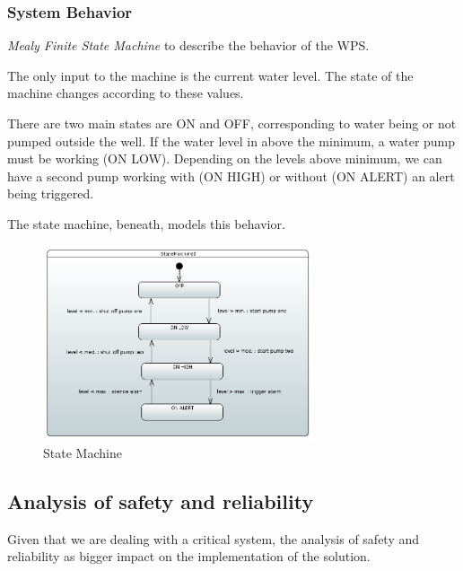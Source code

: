\documentclass[11pt]{article}
\begin{document}
\newpage

\subsubsection{System Behavior}
\textit{Mealy Finite State Machine} to describe the behavior of the WPS.

The only input to the machine is the current water level. The state of the machine changes according to these values.

There are two main states are ON and OFF, corresponding to water being or not pumped outside the well. If the water level in above the minimum, a water pump must be working (ON LOW). Depending on the levels above minimum, we can have a second pump working with (ON HIGH) or without (ON ALERT) an alert being triggered.

The state machine, beneath, models this behavior.

\begin{figure}[H]
  \centering
  \includegraphics[width=300px]{../diagrams/state-machine-wps.png}
  \caption{State Machine}
  \label{fig:State Machine}
\end{figure}


\subsection{Analysis of safety and reliability}

Given that we are dealing with a critical system, the analysis of safety and reliability as bigger impact on the implementation of the solution.
\end{document}

